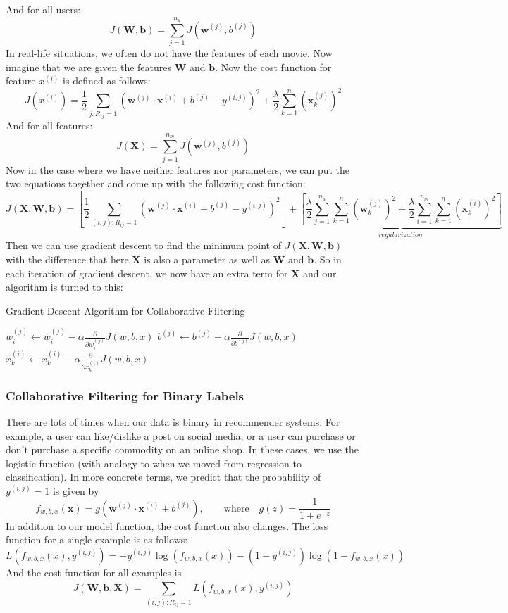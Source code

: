\documentclass[a4paper, 12pt]{book}
\begin{document}
And for all users:
\[J(\mathbf{W}, \mathbf{b}) = \sum_{j=1}^{n_u} J(\mathbf{w}^{(j)}, b^{(j)})\]
In real-life situations, we often do not have the features of each movie. Now imagine that we are given the features $\mathbf{W}$ and $\mathbf{b}$. Now the cost function for feature $x^{(i)}$ is defined as follows:
\[ J(x^{(i)}) = \frac{1}{2}\sum_{j:R_{ij}=1} (\mathbf{w}^{(j)} \cdot \mathbf{x}^{(i)} + b^{(j)} - y^{(i,j)})^2 + \frac{\lambda}{2}\sum_{k=1}^{n}(\mathbf{x}^{(j)}_k)^2 \]
And for all features:
\[ J(\mathbf{X}) = \sum_{j=1}^{n_m} J(\mathbf{w}^{(j)}, b^{(j)}) \]
Now in the case where we have neither features nor parameters, we can put the two equations together and come up with the following cost function:
\[ J(\mathbf{X},\mathbf{W},\mathbf{b}) = \left[ \frac{1}{2}\sum_{(i,j):R_{ij}=1}(\mathbf{w}^{(j)} \cdot \mathbf{x}^{(i)} + b^{(j)} - y^{(i,j)})^2 \right]
+ \underbrace{\left[
\frac{\lambda}{2}
\sum_{j=1}^{n_u}\sum_{k=1}^{n}(\mathbf{w}^{(j)}_k)^2
+ \frac{\lambda}{2}\sum_{i=1}^{n_m}\sum_{k=1}^{n}(\mathbf{x}_k^{(i)})^2
\right]}_{regularization} \]
Then we can use gradient descent to find the minimum point of $J(\mathbf{X},\mathbf{W},\mathbf{b})$ with the difference that here $\mathbf{X}$ is also a parameter as well as $\mathbf{W}$ and $\mathbf{b}$. So in each iteration of gradient descent, we now have an extra term for $\mathbf{X}$ and our algorithm is turned to this:

\begin{algorithm}
\caption{Gradient Descent Algorithm for Collaborative Filtering}
\begin{algorithmic} [1]
\Repeat
    \State $w^{(j)}_i \gets w^{(j)}_i - \alpha{\frac{\partial}{\partial w^{(j)}_i}}J(w,b,x)$
    \State $b^{(j)} \gets b^{(j)} - \alpha{\frac{\partial}{\partial b^{(j)}}}J(w,b,x)$
    \State $x^{(i)}_k \gets x^{(i)}_k - \alpha{\frac{\partial}{\partial x^{(i)}_k}}J(w,b,x)$
\end{algorithmic}
\end{algorithm}

\subsubsection{Collaborative Filtering for Binary Labels}

There are lots of times when our data is binary in recommender systems. For example, a user can like/dislike a post on social media, or a user can purchase or don't purchase a specific commodity on an online shop. In these cases, we use the logistic function (with analogy to when we moved from regression to classification). In more concrete terms, we predict that the probability of $y^{(i,j)} = 1$ is given by \[f_{w,b,x}(\mathbf{x}) = g(\mathbf{w}^{(j)} \cdot \mathbf{x}^{(i)} + b^{(j)}), \qquad \text{where} \quad g(z) = \frac{1}{1+e^{-z}}\]
In addition to our model function, the cost function also changes. The loss function for a single example is as follows:
\[ L(f_{w,b,x}(x), y^{(i,j)}) = -y^{(i,j)} \log (f_{w,b,x}(x)) - (1 - y^{(i,j)})\log(1 - f_{w,b,x}(x)) \]
And the cost function for all examples is
\[J(\mathbf{W}, \mathbf{b}, \mathbf{X}) = \sum_{(i,j):R_{ij}=1} L(f_{w,b,x}(x), y^{(i,j)})\]
\end{document}
